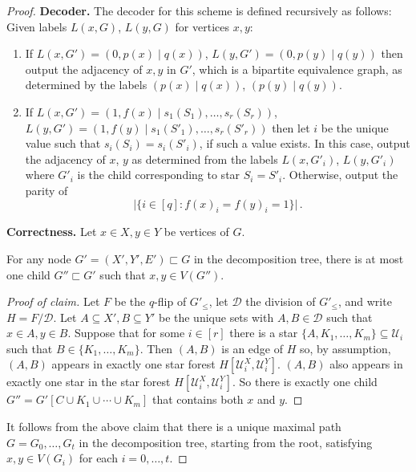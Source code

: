 \documentclass{theoretics}
\newcommand\eqLabelSep{\mathbin|}
\newcommand{\cD}{\ensuremath{\mathcal{D}}}
\newcommand{\cU}{\ensuremath{\mathcal{U}}}
\begin{document}
\begin{proof}
\noindent\textbf{Decoder.}
The decoder for this scheme is defined recursively as follows: Given labels $L(x,G)$, $L(y,G)$ for
vertices $x,y$:
\begin{enumerate}[itemsep=0pt,topsep=4pt,partopsep=0pt]
\item If $L(x,G') = (0, p(x) \eqLabelSep q(x))$, $L(y,G') = (0, p(y) \eqLabelSep q(y))$ then output the adjacency of
$x,y$ in $G'$, which is a bipartite equivalence graph, as determined by the labels $(p(x) \eqLabelSep q(x))$, $(p(y) \eqLabelSep q(y))$.
\item If $L(x,G') = (1, f(x) \eqLabelSep s_1(S_1), \dotsc, s_r(S_r))$, $L(y,G') = (1, f(y) \eqLabelSep s_1(S'_1),
\dotsc, s_r(S'_r))$ then let $i$ be the unique value such that $s_i(S_i)=s_i(S'_i)$, if such a
value exists. In this case, output the adjacency of $x$, $y$ as determined from the labels $L(x,G'_i)$,
$L(y,G'_i)$ where $G'_i$ is the child corresponding to star $S_i = S'_i$.
Otherwise, output the parity of
\[
\bigl|\bigl\{i \in [q] : f(x)_i = f(y)_i = 1 \bigr\}\bigr| \,.
\]
\label{step:flip}
\end{enumerate}

\noindent\textbf{Correctness.}
Let $x \in X, y \in Y$ be vertices of $G$.
\begin{claim}
For any node $G' = (X',Y',E') \sqsubset G$
in the decomposition tree, there is at most one child $G'' \sqsubset G'$ such that $x,y \in V(G'')$.
\end{claim}
\begin{proof}[Proof of claim]
Let $F$ be the $q$-flip of $G'_\leq$, let $\cD$ the division of $G'_\leq$, and write $H = F/\cD$.
Let $A \subseteq X', B \subseteq Y'$ be the unique sets with $A,B \in \cD$ such that $x \in A, y \in
B$. Suppose that for some $i \in [r]$ there is a star $\{A, K_1, \dotsc, K_m\} \subseteq \cU_i$
such that $B \in \{K_1, \dotsc, K_m\}$. Then $(A,B)$ is an edge of $H$ so, by assumption, $(A,B)$
appears in exactly one star forest $H[\cU^X_i,\cU^Y_i]$. $(A,B)$ also appears in exactly one star in
the star forest $H[\cU^X_i,\cU^Y_i]$. So there is exactly one child $G'' = G'[C \cup K_1 \cup \dotsm
\cup K_m]$ that contains both $x$ and $y$.
\end{proof}
It follows from the above claim that there is a unique maximal path $G = G_0, \dotsc, G_t$ in the
decomposition tree, starting from the root, satisfying $x,y \in V(G_i)$ for each $i = 0, \dotsc, t$.


\end{proof}
\end{document}
